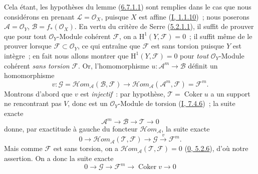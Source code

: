 Cela étant, les hypothèses du lemme
(\hyperref[II.6.7.1.1-fr]{6.7.1.1}) sont remplies dans le cas que nous
considérons en prenant $\mathcal{L}=\mathcal{O}_X$, puisque $X$ est affine
(\hyperref[I.1.1.10-fr]{I, 1.1.10})~; nous poserons
$\mathcal{A}=\mathcal{O}_Y$, $\mathcal{B}=f_*(\mathcal{O}_X)$. En vertu du
critère de Serre (\hyperref[II.5.2.1.1-fr]{5.2.1.1}), il suffit de prouver
que pour tout $\mathcal{O}_Y$-Module cohérent $\mathcal{F}$, on a
$\mathrm{H}^1(Y,\mathcal{F})=0$~; il suffit même de le prouver lorsque
$\mathcal{F}\subset\mathcal{O}_Y$, ce qui entraîne que $\mathcal{F}$ est
sans torsion puisque $Y$ est intègre~; en fait nous allons montrer que
$\mathrm{H}^1(Y,\mathcal{F})=0$ pour \emph{tout} $\mathcal{O}_Y$-Module
cohérent \emph{sans torsion} $\mathcal{F}$. Or, l'homomorphisme
$u:\mathcal{A}^m\to\mathcal{B}$ définit un homomorphisme
\[
v:\mathcal{G}
=\mathcal{H}om_{\mathcal{A}}(\mathcal{B},\mathcal{F})
\longrightarrow
\mathcal{H}om_{\mathcal{A}}(\mathcal{A}^m,\mathcal{F})
=\mathcal{F}^m.
\]
Montrons d'abord que $v$ est \emph{injectif}~: par hypothèse,
$\mathcal{T}=\operatorname{Coker}u$ a un support ne rencontrant pas $V$, donc
est un $\mathcal{O}_Y$-Module de torsion
(\hyperref[I.7.4.6-fr]{I, 7.4.6})~; la suite exacte
\[
\mathcal{A}^m\longrightarrow\mathcal{B}\longrightarrow\mathcal{T}
\longrightarrow0
\]
donne, par exactitude à gauche du foncteur
$\mathcal{H}om_{\mathcal{A}}$, la suite exacte
\[
0\longrightarrow
\mathcal{H}om_{\mathcal{A}}(\mathcal{T},\mathcal{F})
\longrightarrow\mathcal{G}\xrightarrow{v}\mathcal{F}^m.
\]
Mais comme $\mathcal{F}$ est sans torsion, on a
$\mathcal{H}om_{\mathcal{A}}(\mathcal{T},\mathcal{F})=0$
(\hyperref[0.5.2.6-fr]{0, 5.2.6}), d'où notre assertion. On a donc la suite
exacte
\[
0\longrightarrow\mathcal{G}\longrightarrow\mathcal{F}^m
\longrightarrow\operatorname{Coker}v\longrightarrow0
\]

